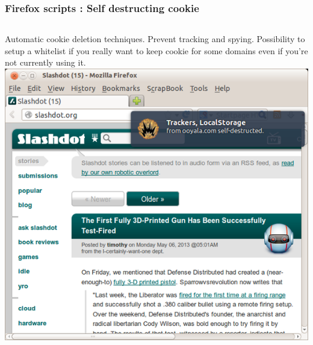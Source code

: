 \begin{frame}
\frametitle{Firefox scripts : Self destructing cookie}

\begin{columns}[c]
Automatic cookie deletion techniques. Prevent tracking and spying.
Possibility to setup a whitelist if you really want to keep cookie for some
domains even if you're not currently using it.
\includegraphics[width=\linewidth] {./materials/selfdestructingcookie.png}
\end{columns}
\end{frame}
